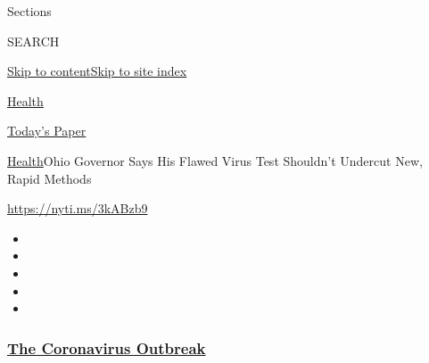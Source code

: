 Sections

SEARCH

\protect\hyperlink{site-content}{Skip to
content}\protect\hyperlink{site-index}{Skip to site index}

\href{https://www.nytimes3xbfgragh.onion/section/health}{Health}

\href{https://myaccount.nytimes3xbfgragh.onion/auth/login?response_type=cookie\&client_id=vi}{}

\href{https://www.nytimes3xbfgragh.onion/section/todayspaper}{Today's
Paper}

\href{/section/health}{Health}\textbar{}Ohio Governor Says His Flawed
Virus Test Shouldn't Undercut New, Rapid Methods

\url{https://nyti.ms/3kABzb9}

\begin{itemize}
\item
\item
\item
\item
\item
\end{itemize}

\hypertarget{the-coronavirus-outbreak}{%
\subsubsection{\texorpdfstring{\href{https://www.nytimes3xbfgragh.onion/news-event/coronavirus?name=styln-coronavirus-national\&region=TOP_BANNER\&variant=undefined\&block=storyline_menu_recirc\&action=click\&pgtype=Article\&impression_id=edb0a130-e3ab-11ea-af8a-cf9df229f915}{The
Coronavirus
Outbreak}}{The Coronavirus Outbreak}}\label{the-coronavirus-outbreak}}


